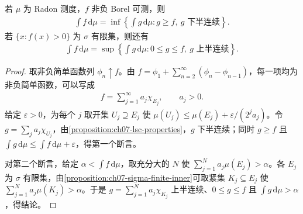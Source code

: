 \documentclass[../../main.tex]{subfiles}
\begin{document}
\begin{proposition}\label{proposition:ch07-semicontinuous-integral-approximation}
若 $\mu$ 为 Radon 测度，$f$ 非负 Borel 可测，则
\begin{align*}
\int f\,\mathrm d\mu=\inf\left\{\int g\,\mathrm d\mu:g\geqslant f,\ g\text{ 下半连续}\right\}.
\end{align*}
若 $\{x:f(x)>0\}$ 为 $\sigma$ 有限集，则还有
\begin{align*}
\int f\,\mathrm d\mu=\sup\left\{\int g\,\mathrm d\mu:0\leqslant g\leqslant f,\ g\text{ 上半连续}\right\}.
\end{align*}
\end{proposition}
\begin{proof}
取非负简单函数列 $\phi_n\uparrow f$。由 $f=\phi_1+\sum_{n=2}^\infty(\phi_n-\phi_{n-1})$，每一项均为非负简单函数，可以写成
\begin{align*}
f=\sum_{j=1}^\infty a_j\chi_{E_j},\qquad a_j>0.
\end{align*}
给定 $\varepsilon>0$，为每个 $j$ 取开集 $U_j\supseteq E_j$ 使 $\mu(U_j)\leqslant\mu(E_j)+\varepsilon/(2^ja_j)$。令 $g=\sum_j a_j\chi_{U_j}$，由\cref{proposition:ch07-lsc-properties}，$g$ 下半连续；同时 $g\geqslant f$ 且 $\int g\,\mathrm d\mu\leqslant\int f\,\mathrm d\mu+\varepsilon$，得第一个断言。

对第二个断言，给定 $\alpha<\int f\,\mathrm d\mu$，取充分大的 $N$ 使 $\sum_{j=1}^N a_j\mu(E_j)>\alpha$。各 $E_j$ 为 $\sigma$ 有限集，由\cref{proposition:ch07-sigma-finite-inner}可取紧集 $K_j\subseteq E_j$ 使 $\sum_{j=1}^N a_j\mu(K_j)>\alpha$。于是 $g=\sum_{j=1}^N a_j\chi_{K_j}$ 上半连续、$0\leqslant g\leqslant f$ 且 $\int g\,\mathrm d\mu>\alpha$，得结论。
\end{proof}
\end{document}
